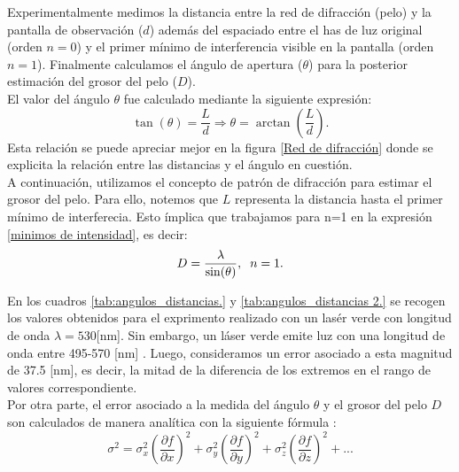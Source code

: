 \documentclass[10pt,a4paper]{article}
\begin{document}
\begin{multicols}{2}
		Experimentalmente medimos la distancia entre la red de difracción (pelo) y la pantalla de observación ($d$) además del  espaciado entre el has de luz original (orden $n = 0$) y el primer mínimo de interferencia visible en la pantalla (orden $n=1$). Finalmente calculamos el ángulo de apertura ($\theta$) para la posterior estimación del grosor del pelo ($D$).\\
		El valor del ángulo $\theta$ fue calculado mediante la siguiente expresión:
		\begin{equation} 
		\tan(\theta) = \frac{L}{d} \Longrightarrow \theta = \arctan(\frac{L}{d}).
		\end{equation}
		Esta relación se puede apreciar mejor en la figura \ref{Red de difracción} donde se explicita la relación entre las distancias y el ángulo en cuestión.\\
		A continuación, utilizamos el concepto de patrón de difracción para estimar el grosor del pelo. Para ello, notemos que $L$ representa la distancia hasta el primer mínimo de interferecia. Esto ímplica que trabajamos para n=1 en la expresión \ref{minimos de intensidad}, es decir:
		\begin{equation} \label{minimo de intensidad para n=1}
		D = \frac{\lambda}{\sin(\theta)}, \hspace{2mm} n = 1.
		\end{equation}
		
		En los cuadros \ref{tab:angulos_distancias.} y \ref{tab:angulos_distancias 2.} se recogen los valores obtenidos para el exprimento realizado con un lasér verde con longitud de onda $\lambda = 530$[nm]. Sin embargo, un láser verde emite luz con una longitud de onda entre 495-570 [nm] \cite{colors}. Luego, consideramos un error asociado a esta magnitud de 37.5 [nm], es decir, la mitad de la diferencia de los extremos en el rango de valores correspondiente.\\
		
		Por otra parte, el error asociado a la medida del ángulo $\theta$ y el grosor del pelo $D$ son calculados de manera analítica con la siguiente fórmula \cite{error}:
		\begin{equation}\label{errores}
		\sigma^2 = \sigma^2_x \left( \frac{\partial f}{\partial x} \right)^2 + \sigma^2_y \left( \frac{\partial f}{\partial y} \right)^2 + \sigma^2_z \left( \frac{\partial f}{\partial z} \right)^2+...
		\end{equation}
	\end{multicols}
	
\end{document}
